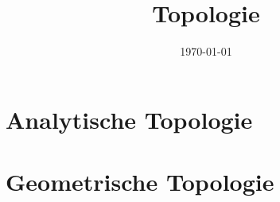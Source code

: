 \documentclass{mycourse}
\title{Topologie}
\date{\today}
\begin{document}
\maketitle

\tableofcontents


\part{Analytische Topologie}





\part{Geometrische Topologie}


\end{document}
